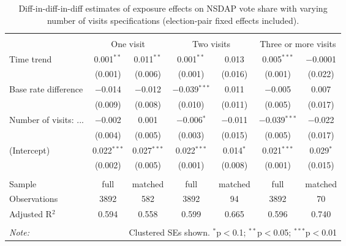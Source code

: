 
\begin{table}[!htbp] \centering 
  \caption{Diff-in-diff-in-diff estimates of exposure effects on NSDAP vote share with varying number of visits specifications (election-pair fixed effects included).\vspace{-.25cm}} 
  \label{tab:nsdap-voteshare-numvisits-dd} 
\scriptsize 
\begin{tabular}{@{\extracolsep{5pt}}lcccccc} 
\\[-1.8ex]\hline 
\hline \\[-1.8ex] 
 & \multicolumn{2}{c}{One visit } & \multicolumn{2}{c}{Two visits} & \multicolumn{2}{c}{Three or more visits} \\ 
 \cmidrule(r){2-3}\cmidrule(r){4-5}\cmidrule(r){6-7}Time trend & 0.001$^{**}$ & 0.011$^{**}$ & 0.001$^{**}$ & 0.013 & 0.005$^{***}$ & $-$0.0001 \\ 
  & (0.001) & (0.006) & (0.001) & (0.016) & (0.001) & (0.022) \\ 
  Base rate difference & $-$0.014 & $-$0.012 & $-$0.039$^{***}$ & 0.011 & $-$0.005 & 0.007 \\ 
  & (0.009) & (0.008) & (0.010) & (0.011) & (0.005) & (0.017) \\ 
  Number of visits: ... & $-$0.002 & 0.001 & $-$0.006$^{*}$ & $-$0.011 & $-$0.039$^{***}$ & $-$0.022 \\ 
  & (0.004) & (0.005) & (0.003) & (0.015) & (0.005) & (0.017) \\ 
  (Intercept) & 0.022$^{***}$ & 0.027$^{***}$ & 0.022$^{***}$ & 0.014$^{*}$ & 0.021$^{***}$ & 0.029$^{*}$ \\ 
  & (0.002) & (0.005) & (0.001) & (0.008) & (0.001) & (0.015) \\ 
 \hline \\[-1.8ex] 
Sample & full & matched & full & matched & full & matched \\ 
Observations & 3892 & 582 & 3892 & 94 & 3892 & 70 \\ 
Adjusted R$^{2}$ & 0.594 & 0.558 & 0.599 & 0.665 & 0.596 & 0.740 \\ 
\hline 
\hline \\[-1.8ex] 
\textit{Note:}  & \multicolumn{6}{r}{Clustered SEs shown. $^{*}$p$<$0.1; $^{**}$p$<$0.05; $^{***}$p$<$0.01} \\ 
\end{tabular} 
\end{table} 
